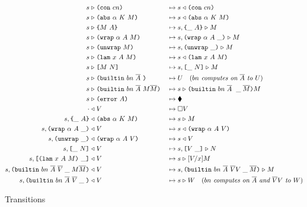 \begin{figure*}[!ht]
\begin{subfigure}[c]{\linewidth}   %
{\small
\caption{Transitions}
     \begin{alignat*}{2}
      s &\compute \con{cn}                 &{}\mapsto{}& s \return \con{cn}\\
      s &\compute \abs{\alpha}{K}{M}       &{}\mapsto{}& s \return \abs{\alpha}{K}{M}\\
      s &\compute \inst{M}{A}              &{}\mapsto{}& s,\inInstLeftFrame{A} \compute M\\
      s &\compute \wrap{\alpha}{A}{M}      &{}\mapsto{}& s,\inWrapRightFrame{\alpha}{A} \compute M\\
      s &\compute \unwrap{M}               &{}\mapsto{}& s,\inUnwrapFrame{} \compute M\\
      s &\compute \lam{x}{A}{M}            &{}\mapsto{}& s \return \lam{x}{A}{M}\\
      s &\compute \app{M}{N}               &{}\mapsto{}& s,\inAppLeftFrame{N} \compute M\\
      s &\compute \builtin{bn}{\repetition{A}}{} &{}\mapsto{}& 
                                      U \quad (\textit{$bn$ computes on $\repetition{A}$ to $U$})\\
      s &\compute \builtin{bn}{\repetition{A}}{M \repetition{M}} &{}\mapsto{}& 
                                      s \compute \inBuiltin{bn}{\repetition{A}}{}{\_}{\repetition{M}}{M}\\
      s &\compute \error{A} &{}\mapsto{}& \ckerror{}\\
      \cdot &\return V &{}\mapsto{}& \square V\\
      s,\inInstLeftFrame{A} &\return \abs{\alpha}{K}{M} &{}\mapsto{}& s \compute{M} \\
      s,\inWrapRightFrame{\alpha}{A} &\return V         &{}\mapsto{}& s \return \wrap{\alpha}{A}{V}\\
      s,\inUnwrapFrame{} &\return {\wrap{\alpha}{A}{V}} &{}\mapsto{}& s \return V\\
      s,\inAppLeftFrame{N} &\return V                   &{}\mapsto{}& s, \inAppRightFrame{V} \compute N\\
      s,\inAppRightFrame{\lam{x}{A}{M}} &\return V      &{}\mapsto{}& s \compute \subst{V}{x}{M}\\
      s,  \inBuiltin{bn}{\repetition{A}}{\repetition{V}}{\_}{M \repetition{M}} &\return V &{}\mapsto{}& s, \inBuiltin{bn}{\repetition{A}}{\repetition{V} V}{\_}{\repetition{M}} \compute M\\
      s,\inBuiltin{bn}{\repetition{A}}{\repetition{V}}{\_}{} &\return V &{}\mapsto{}& s \compute W \quad (\textit{$bn$ computes on $\repetition{A}$ and $\repetition{V}V$ to $W$})\\
    \end{alignat*}
}
\end{subfigure}
\end{figure*}


